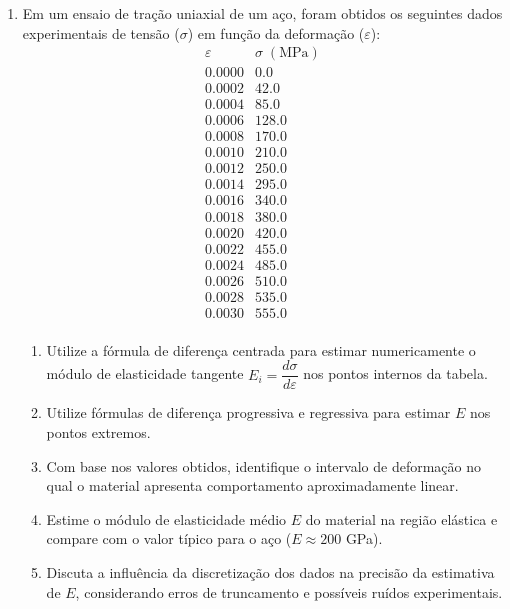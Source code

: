 \begin{enumerate}[label=\thesection.\arabic*]
\item Em um ensaio de tração uniaxial de um aço, foram obtidos os seguintes dados experimentais de tensão ($\sigma$) 
em função da deformação ($\varepsilon$):
\[
\begin{array}{c|c}
\varepsilon & \sigma \; (\text{MPa}) \\
\hline
0.0000 &   0.0 \\
0.0002 &  42.0 \\
0.0004 &  85.0 \\
0.0006 & 128.0 \\
0.0008 & 170.0 \\
0.0010 & 210.0 \\
0.0012 & 250.0 \\
0.0014 & 295.0 \\
0.0016 & 340.0 \\
0.0018 & 380.0 \\
0.0020 & 420.0 \\
0.0022 & 455.0 \\
0.0024 & 485.0 \\
0.0026 & 510.0 \\
0.0028 & 535.0 \\
0.0030 & 555.0 \\
\end{array}
\]

\begin{enumerate}
\item Utilize a fórmula de diferença centrada para estimar numericamente o módulo de elasticidade tangente
 $ E_i = \dfrac{d\sigma}{d\varepsilon}$ nos pontos internos da tabela.

\item Utilize fórmulas de diferença progressiva e regressiva para estimar $E$ nos pontos extremos.

\item Com base nos valores obtidos, identifique o intervalo de deformação no qual o material apresenta comportamento aproximadamente linear.

\item Estime o módulo de elasticidade médio $E$ do material na região elástica e compare com o valor típico para o aço ($E \approx 200$ GPa).

\item Discuta a influência da discretização dos dados na precisão da estimativa de $E$, 
considerando erros de truncamento e possíveis ruídos experimentais.

\end{enumerate}



\end{enumerate}
